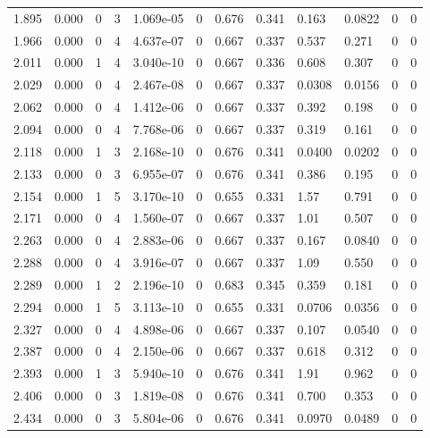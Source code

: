 \documentclass[preview]{standalone}
\begin{document}
{{{\begin{tabular}{L{1.2cm}C{1.2cm} C{0.3cm}C{0.5cm} C{1.4cm}C{1.4cm} C{1.4cm}C{1.4cm} C{1.6cm}C{1.6cm} C{1.6cm}C{1.6cm}}
  1.895  &  0.000  & 0     &  3 &  1.069e-05  & 0  &  0.676&   0.341& 0.163 & 0.0822   &  0 & 0  \\ 
  1.966  &  0.000  & 0     &  4 &  4.637e-07  & 0  &  0.667&   0.337& 0.537 & 0.271   &  0 & 0  \\ 
  2.011  &  0.000  & 1     &  4 &  3.040e-10  & 0  &  0.667&   0.336& 0.608 & 0.307   &  0 & 0  \\ 
  2.029  &  0.000  & 0     &  4 &  2.467e-08  & 0  &  0.667&   0.337& 0.0308 & 0.0156   &  0 & 0  \\ 
  2.062  &  0.000  & 0     &  4 &  1.412e-06  & 0  &  0.667&   0.337& 0.392 & 0.198   &  0 & 0  \\ 
  2.094  &  0.000  & 0     &  4 &  7.768e-06  & 0  &  0.667&   0.337& 0.319 & 0.161   &  0 & 0  \\ 
  2.118  &  0.000  & 1     &  3 &  2.168e-10  & 0  &  0.676&   0.341& 0.0400 & 0.0202   &  0 & 0  \\ 
  2.133  &  0.000  & 0     &  3 &  6.955e-07  & 0  &  0.676&   0.341& 0.386 & 0.195   &  0 & 0  \\ 
  2.154  &  0.000  & 1     &  5 &  3.170e-10  & 0  &  0.655&   0.331& 1.57 & 0.791   &  0 & 0  \\ 
  2.171  &  0.000  & 0     &  4 &  1.560e-07  & 0  &  0.667&   0.337& 1.01 & 0.507   &  0 & 0  \\ 
  2.263  &  0.000  & 0     &  4 &  2.883e-06  & 0  &  0.667&   0.337& 0.167 & 0.0840   &  0 & 0  \\ 
  2.288  &  0.000  & 0     &  4 &  3.916e-07  & 0  &  0.667&   0.337& 1.09 & 0.550   &  0 & 0  \\ 
  2.289  &  0.000  & 1     &  2 &  2.196e-10  & 0  &  0.683&   0.345& 0.359 & 0.181   &  0 & 0  \\ 
  2.294  &  0.000  & 1     &  5 &  3.113e-10  & 0  &  0.655&   0.331& 0.0706 & 0.0356   &  0 & 0  \\ 
  2.327  &  0.000  & 0     &  4 &  4.898e-06  & 0  &  0.667&   0.337& 0.107 & 0.0540   &  0 & 0  \\ 
  2.387  &  0.000  & 0     &  4 &  2.150e-06  & 0  &  0.667&   0.337& 0.618 & 0.312   &  0 & 0  \\ 
  2.393  &  0.000  & 1     &  3 &  5.940e-10  & 0  &  0.676&   0.341& 1.91 & 0.962   &  0 & 0  \\ 
  2.406  &  0.000  & 0     &  3 &  1.819e-08  & 0  &  0.676&   0.341& 0.700 & 0.353   &  0 & 0  \\ 
  2.434  &  0.000  & 0     &  3 &  5.804e-06  & 0  &  0.676&   0.341& 0.0970 & 0.0489   &  0 & 0  \\ 

\end{tabular}}}}
\end{document}
